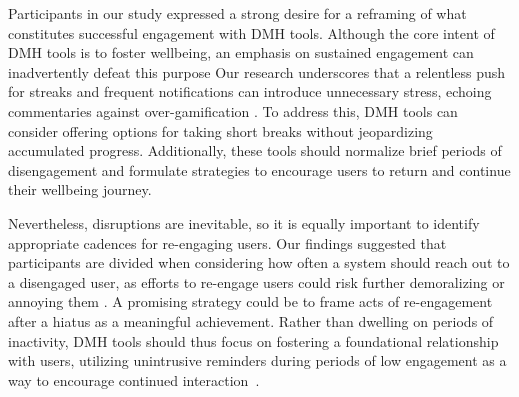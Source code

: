 Participants in our study expressed a strong desire for a reframing of what constitutes successful engagement with DMH tools. Although the core intent of DMH tools is to foster wellbeing, an emphasis on sustained engagement can inadvertently defeat this purpose  Our research underscores that a relentless push for streaks and frequent notifications can introduce unnecessary stress, echoing commentaries against over-gamification \cite{etkin2016hidden, bekk2022all, liu2017toward, jia2016personality, hamari2014does, epstein2015lived}. %
To address this, DMH tools can consider offering options for taking short breaks without jeopardizing accumulated progress. Additionally, these tools should normalize brief periods of disengagement and formulate strategies to encourage users to return and continue their wellbeing journey.

Nevertheless, disruptions are inevitable, so it is equally important to identify appropriate cadences for re-engaging users. Our findings suggested that participants are divided when considering how often a system should reach out to a disengaged user, as efforts to re-engage users could risk further demoralizing or annoying them \cite{bhattacharjee2022kind, epstein2015lived}. A promising strategy could be to frame acts of re-engagement after a hiatus as a meaningful achievement. Rather than dwelling on periods of inactivity, DMH tools should thus focus on fostering a foundational relationship with users, utilizing unintrusive reminders during periods of low engagement as a way to encourage continued interaction~\cite{bhattacharjee2023integrating, yardley2015person}. 

